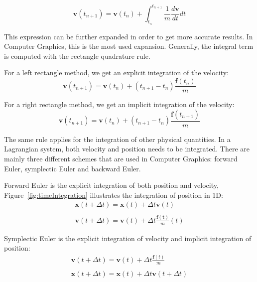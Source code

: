 \begin{equation}
\label{eq:timeIntegration2}
\displaystyle
\mathbf{v}(t_{n+1}) = \mathbf{v}(t_{n}) + \int_{t_{n}}^{t_{n+1}}\frac{1}{m}\frac{d\mathbf{v}}{dt} dt
\end{equation}

This expression can be further expanded in order to get more accurate results. 
In Computer Graphics, this is the most used expansion. 
Generally, the integral term is computed with the rectangle quadrature rule.

For a left rectangle method, we get an explicit integration of the velocity:
\begin{equation}
\label{eq:explicitIntegration}
\mathbf{v}(t_{n+1}) = \mathbf{v}(t_{n}) + \left(t_{n+1}-t_{n}\right) \frac{\mathbf{f}(t_{n})}{m}
\end{equation}

For a right rectangle method, we get an implicit integration of the velocity:
\begin{equation}
\label{eq:implicitIntegration}
\mathbf{v}(t_{n+1}) = \mathbf{v}(t_{n}) + \left(t_{n+1}-t_{n}\right) \frac{\mathbf{f}(t_{n+1})}{m}
\end{equation}

The same rule applies for the integration of other physical quantities. In a Lagrangian system, both velocity and position needs to be integrated. There are mainly three different schemes that are used in Computer Graphics: forward Euler, symplectic Euler and backward Euler.

Forward Euler is the explicit integration of both position and velocity,
Figure~\ref{fig:timeIntegration} illustrates the integration of position in 1D:
\begin{equation}
\label{eq:explicitEuler}
\begin{array}{l}
\displaystyle \mathbf{x}(t+\Delta t) = \mathbf{x}(t) + \Delta t \mathbf{v}(t) \\ \\
\displaystyle \mathbf{v}(t+\Delta t) = \mathbf{v}(t) + \Delta t \frac{\mathbf{f(t)}}{m}(t)
\end{array}
\end{equation}

Symplectic Euler is the explicit integration of velocity and implicit integration of position:
\begin{equation}
\label{eq:symplecticEuler}
\begin{array}{l}
\displaystyle \mathbf{v}(t+\Delta t) = \mathbf{v}(t) + \Delta t \frac{\mathbf{f}(t)}{m} \\ \\
\displaystyle \mathbf{x}(t+\Delta t) = \mathbf{x}(t) + \Delta t \mathbf{v}(t+\Delta t)
\end{array}
\end{equation}

